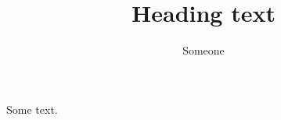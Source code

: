 \documentclass{exam}
\title{Heading text}
\author{Someone}
\begin{document}
\maketitle
Some text.
\end{document}
